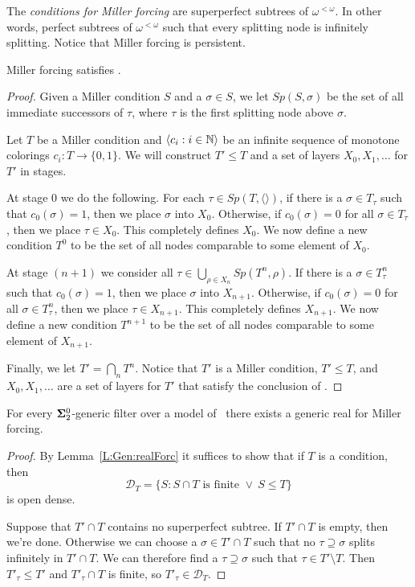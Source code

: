 The \textit{conditions for Miller forcing} are superperfect subtrees of $\omega^{<\omega}$.
In other words, perfect subtrees of $\omega^{<\omega}$ such that
every splitting node is infinitely splitting.
Notice that Miller forcing is persistent.

\begin{prop}[\ACAo]\label{P:M:MCP}
Miller forcing satisfies \MCP.
\end{prop}
\begin{proof}
Given a Miller condition $S$ and a $\sigma\in S$,
we let $Sp(S,\sigma)$ be the set of all immediate successors of $\tau$,
where $\tau$ is the first splitting node above $\sigma$.

Let $T$ be a Miller condition and $\langle c_i:i\in\mathbb{N}\rangle$ be an
infinite sequence of monotone colorings $c_i:T\rightarrow \{0,1\}$.
We will construct $T'\leq T$ and a set of layers $X_0,X_1,\ldots$ for $T'$ in stages.

At stage 0 we do the following.
For each $\tau\in Sp(T,\langle\rangle)$,
if there is a $\sigma\in T_\tau$ such that $c_0(\sigma)=1$,
then we place $\sigma$ into $X_0$.
Otherwise, if $c_0(\sigma)=0$ for all $\sigma\in T_\tau$,
then we place $\tau\in X_0$.
This completely defines $X_0$.
We now define a new condition $T^0$ to be the set of all
nodes comparable to some element of $X_0$.

At stage $(n+1)$ we consider all
$\tau\in \bigcup_{\rho\in X_n}Sp(T^n,\rho)$.
If there is a $\sigma\in T^n_\tau$ such that $c_0(\sigma)=1$,
then we place $\sigma$ into $X_{n+1}$.
Otherwise, if $c_0(\sigma)=0$ for all $\sigma\in T^n_\tau$,
then we place $\tau\in X_{n+1}$.
This completely defines $X_{n+1}$.
We now define a new condition $T^{n+1}$ to be the set of all
nodes comparable to some element of $X_{n+1}$.

Finally, we let $T'=\bigcap_n T^n$.
Notice that $T'$ is a Miller condition, $T'\leq T$,
and $X_0,X_1,\ldots$ are a set of layers for $T'$
that satisfy the conclusion of \MCP.
\end{proof}

\begin{lem}\label{L:M:realForc}
For every $\mathbf{\Sigma}^0_2$-generic filter over a model of \RCAo\
there exists a generic real for Miller forcing.
\end{lem}

\begin{proof}
By Lemma~\ref{L:Gen:realForc} it
suffices to show that if $T$ is a condition, then
$$\mathcal{D}_T=\{S:S\cap T\text{ is finite }\lor\ S\leq T\}$$
is open dense.

Suppose that $T'\cap T$ contains no superperfect subtree.
If $T'\cap T$ is empty, then we're done.
Otherwise we can choose a $\sigma\in T'\cap T$ such that no
$\tau\supseteq\sigma$ splits infinitely in $T'\cap T$.
We can therefore find a $\tau\supseteq\sigma$ such that
$\tau\in T'\setminus T$.
Then $T'_\tau\leq T'$ and $T'_\tau\cap T$ is finite,
so $T'_\tau\in\mathcal{D}_T$.
\end{proof}


